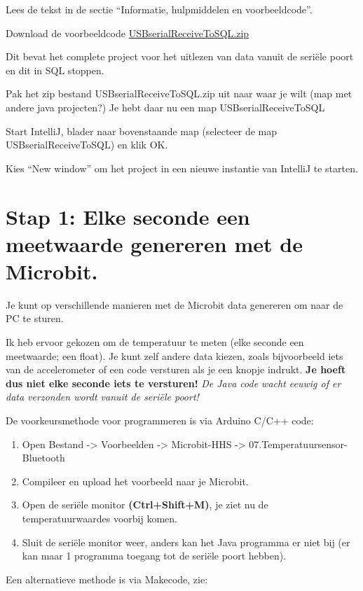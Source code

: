 Lees de tekst in de sectie “Informatie, hulpmiddelen en voorbeeldcode”.


Download de voorbeeldcode 
\href{https://blackboard.hhs.nl/bbcswebdav/pid-2889780-dt-content-rid-24452591_2/xid-24452591_2
}{USBserialReceiveToSQL.zip}

Dit bevat het complete project voor het uitlezen van data vanuit de seriële poort en dit in SQL stoppen.

Pak het zip bestand USBserialReceiveToSQL.zip uit naar waar je wilt (map met andere java projecten?)
Je hebt daar nu een map USBserialReceiveToSQL

Start IntelliJ, blader naar bovenstaande map (selecteer de map USBserialReceiveToSQL) en klik OK.

Kies “New window” om het project in een nieuwe instantie van IntelliJ te starten.

\section{Stap 1: Elke seconde een meetwaarde genereren met de Microbit.}

Je kunt op verschillende manieren met de Microbit data genereren om naar de PC te sturen.

Ik heb ervoor gekozen om de temperatuur te meten (elke seconde een meetwaarde; een float). 
Je kunt zelf andere data kiezen, zoals bijvoorbeeld iets van de accelerometer of een code versturen als je een knopje indrukt. \textbf{Je hoeft dus niet elke seconde iets te versturen!} \textit{De Java code wacht eeuwig of er data verzonden wordt vanuit de seriële poort!}

De voorkeursmethode voor programmeren is via Arduino C/C++ code:  

\begin{enumerate}
	\item Open Bestand -> Voorbeelden -> Microbit-HHS -> 07.Temperatuursensor-Bluetooth
	\item Compileer en upload het voorbeeld naar je Microbit.
	\item Open de seriële monitor \colorbox{mygray}{\textbf{(Ctrl+Shift+M)}}, je ziet nu de temperatuurwaardes voorbij komen.
	\item Sluit de seriële monitor weer, anders kan het Java programma er niet bij (er kan maar 1 programma toegang tot de seriële poort hebben).
	
\end{enumerate}


Een alternatieve methode is via Makecode, zie:

